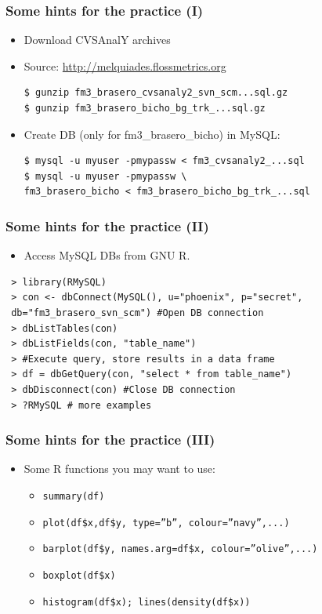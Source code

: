 \documentclass{beamer}
\begin{document}

\begin{frame}[fragile]
\frametitle{Some hints for the practice (I)}
\begin{itemize}
\item Download CVSAnalY archives\\
\item Source: \url{http://melquiades.flossmetrics.org}
 \begin{verbatim}
$ gunzip fm3_brasero_cvsanaly2_svn_scm...sql.gz
$ gunzip fm3_brasero_bicho_bg_trk_...sql.gz
\end{verbatim}
\item Create DB (only for fm3\_brasero\_bicho) in MySQL:
\begin{verbatim}
$ mysql -u myuser -pmypassw < fm3_cvsanaly2_...sql
$ mysql -u myuser -pmypassw \
fm3_brasero_bicho < fm3_brasero_bicho_bg_trk_...sql
 \end{verbatim}
\end{itemize}
\end{frame}


\begin{frame}[fragile]
\frametitle{Some hints for the practice (II)}

\begin{itemize}
 \item Access MySQL DBs from GNU R.
\end{itemize}
\vspace{-0.5cm}
\begin{verbatim}
 > library(RMySQL)
 > con <- dbConnect(MySQL(), u="phoenix", p="secret",
 db="fm3_brasero_svn_scm") #Open DB connection
 > dbListTables(con)
 > dbListFields(con, "table_name")
 > #Execute query, store results in a data frame
 > df = dbGetQuery(con, "select * from table_name") 
 > dbDisconnect(con) #Close DB connection
 > ?RMySQL # more examples
\end{verbatim}

\end{frame}


\begin{frame}[fragile]
\frametitle{Some hints for the practice (III)}
\begin{itemize}
\item Some R functions you may want to use:
  \begin{itemize}
  \item \texttt{summary(df)}
  \item \texttt{plot(df\$x,df\$y, type=''b'', colour=''navy'',...)}
  \item \texttt{barplot(df\$y, names.arg=df\$x, colour=''olive'',...)}
  \item \texttt{boxplot(df\$x)}
  \item \texttt{histogram(df\$x); lines(density(df\$x))}
  \end{itemize}
\end{itemize}
\end{frame}
\end{document}
